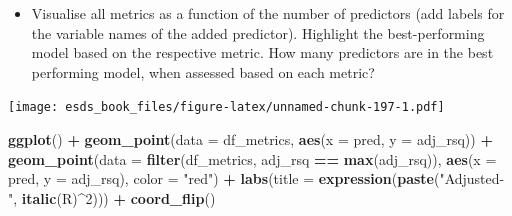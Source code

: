 \documentclass[
]{book}
\newenvironment{Shaded}{\begin{snugshade}}{\end{snugshade}}
\newcommand{\DataTypeTok}[1]{\textcolor[rgb]{0.13,0.29,0.53}{#1}}
\newcommand{\DecValTok}[1]{\textcolor[rgb]{0.00,0.00,0.81}{#1}}
\newcommand{\KeywordTok}[1]{\textcolor[rgb]{0.13,0.29,0.53}{\textbf{#1}}}
\newcommand{\NormalTok}[1]{#1}
\newcommand{\OperatorTok}[1]{\textcolor[rgb]{0.81,0.36,0.00}{\textbf{#1}}}
\newcommand{\StringTok}[1]{\textcolor[rgb]{0.31,0.60,0.02}{#1}}
\providecommand{\tightlist}{%
  \setlength{\itemsep}{0pt}\setlength{\parskip}{0pt}}
\begin{document}
\begin{itemize}
\tightlist
\item
  Visualise all metrics as a function of the number of predictors (add labels for the variable names of the added predictor). Highlight the best-performing model based on the respective metric. How many predictors are in the best performing model, when assessed based on each metric?
\end{itemize}

\begin{Shaded}
\end{Shaded}

\texttt{[image: esds\_book\_files/figure-latex/unnamed-chunk-197-1.pdf]}

\begin{Shaded}
\begin{Highlighting}[]
\KeywordTok{ggplot}\NormalTok{() }\OperatorTok{+}
\StringTok{  }\KeywordTok{geom_point}\NormalTok{(}\DataTypeTok{data =}\NormalTok{ df_metrics, }\KeywordTok{aes}\NormalTok{(}\DataTypeTok{x =}\NormalTok{ pred, }\DataTypeTok{y =}\NormalTok{ adj_rsq)) }\OperatorTok{+}
\StringTok{  }\KeywordTok{geom_point}\NormalTok{(}\DataTypeTok{data =} \KeywordTok{filter}\NormalTok{(df_metrics, adj_rsq }\OperatorTok{==}\StringTok{ }\KeywordTok{max}\NormalTok{(adj_rsq)), }\KeywordTok{aes}\NormalTok{(}\DataTypeTok{x =}\NormalTok{ pred, }\DataTypeTok{y =}\NormalTok{ adj_rsq), }\DataTypeTok{color =} \StringTok{"red"}\NormalTok{) }\OperatorTok{+}
\StringTok{  }\KeywordTok{labs}\NormalTok{(}\DataTypeTok{title =} \KeywordTok{expression}\NormalTok{(}\KeywordTok{paste}\NormalTok{(}\StringTok{"Adjusted-"}\NormalTok{, }\KeywordTok{italic}\NormalTok{(R)}\OperatorTok{^}\DecValTok{2}\NormalTok{))) }\OperatorTok{+}\StringTok{ }
\StringTok{  }\KeywordTok{coord_flip}\NormalTok{()}
\end{Highlighting}
\end{Shaded}
\end{document}
